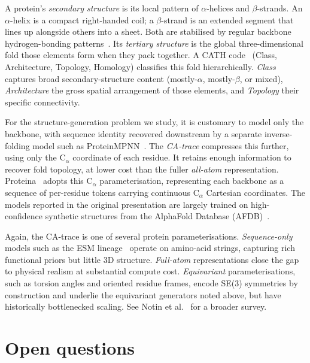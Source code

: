 \documentclass[12pt,a4paper,twoside]{report}
\begin{document}
A protein's \emph{secondary structure} is its local pattern of $\alpha$-helices and $\beta$-strands. An $\alpha$-helix is a compact right-handed coil; a $\beta$-strand is an extended segment that lines up alongside others into a sheet. Both are stabilised by regular backbone hydrogen-bonding patterns~\cite{DSSP}. Its \emph{tertiary structure} is the global three-dimensional fold those elements form when they pack together. A CATH code~\cite{CATH} (Class, Architecture, Topology, Homology) classifies this fold hierarchically. \emph{Class} captures broad secondary-structure content (mostly-$\alpha$, mostly-$\beta$, or mixed), \emph{Architecture} the gross spatial arrangement of those elements, and \emph{Topology} their specific connectivity.

For the structure-generation problem we study, it is customary to model only the backbone, with sequence identity recovered downstream by a separate inverse-folding model such as ProteinMPNN~\cite{ProteinMPNN}. The \emph{CA-trace} compresses this further, using only the C$_\alpha$ coordinate of each residue. It retains enough information to recover fold topology, at lower cost than the fuller \emph{all-atom} representation. Proteina~\cite{Proteina} adopts this C$_\alpha$ parameterisation, representing each backbone as a sequence of per-residue tokens carrying continuous C$_\alpha$ Cartesian coordinates. The models reported in the original presentation are largely trained on high-confidence synthetic structures from the AlphaFold Database (AFDB)~\cite{AFDB}.

Again, the CA-trace is one of several protein parameterisations. \emph{Sequence-only} models such as the ESM lineage~\cite{ESM2} operate on amino-acid strings, capturing rich functional priors but little 3D structure. \emph{Full-atom} representations close the gap to physical realism at substantial compute cost. \emph{Equivariant} parameterisations, such as torsion angles and oriented residue frames, encode SE(3) symmetries by construction and underlie the equivariant generators noted above, but have historically bottlenecked scaling. See Notin et al.~\cite{NotinProteinDesign} for a broader survey.

\section{Open questions}
\label{sec:open-questions}

\end{document}
